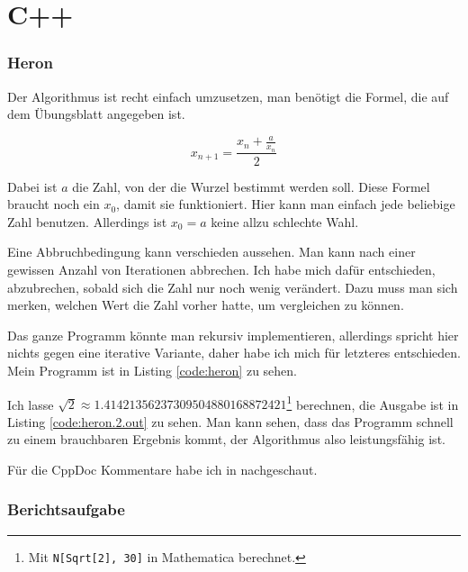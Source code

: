 
\part{C++}

\section{Heron}

Der Algorithmus ist recht einfach umzusetzen, man benötigt die Formel, die auf dem Übungsblatt angegeben ist.

\begin{equation}
x_{n+1}=\frac{x_n+\frac{a}{x_n}}{2}
\end{equation}

Dabei ist $a$ die Zahl, von der die Wurzel bestimmt werden soll. Diese Formel braucht noch ein $x_0$, damit sie funktioniert. Hier kann man einfach jede beliebige Zahl benutzen. Allerdings ist $x_0=a$ keine allzu schlechte Wahl.

Eine Abbruchbedingung kann verschieden aussehen. Man kann nach einer gewissen Anzahl von Iterationen abbrechen. Ich habe mich dafür entschieden, abzubrechen, sobald sich die Zahl nur noch wenig verändert. Dazu muss man sich merken, welchen Wert die Zahl vorher hatte, um vergleichen zu können.

Das ganze Programm könnte man rekursiv implementieren, allerdings spricht hier nichts gegen eine iterative Variante, daher habe ich mich für letzteres entschieden. Mein Programm ist in Listing \ref{code:heron} zu sehen.


Ich lasse $\sqrt{2} \approx 1.41421356237309504880168872421$\footnote{Mit \texttt{N[Sqrt[2], 30]} in Mathematica berechnet.} berechnen, die Ausgabe ist in Listing \ref{code:heron.2.out} zu sehen. Man kann sehen, dass das Programm schnell zu einem brauchbaren Ergebnis kommt, der Algorithmus also leistungsfähig ist.


Für die CppDoc Kommentare habe ich in \cite{cppdoc} nachgeschaut.

\section{Berichtsaufgabe}

